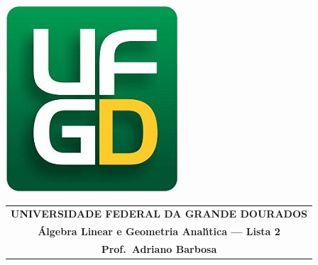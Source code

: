 \documentclass[a4paper,5pt]{amsbook}
\begin{document}
\thispagestyle{empty}
\begin{minipage}[h]{0.14\textwidth}
	\includegraphics[scale=0.24]{../../ufgd.png}
\end{minipage}
\begin{minipage}[h]{\textwidth}
\begin{tabular}{c}
{{\bf UNIVERSIDADE FEDERAL DA GRANDE DOURADOS}}\\
{{\bf \'{A}lgebra Linear e Geometria Anal\'{\i}tica --- Lista 2}}\\
{{\bf Prof.\ Adriano Barbosa}}\\
\end{tabular}
\vspace{-0.45cm}
%
\end{minipage}

\vspace{1cm}
\end{document}
